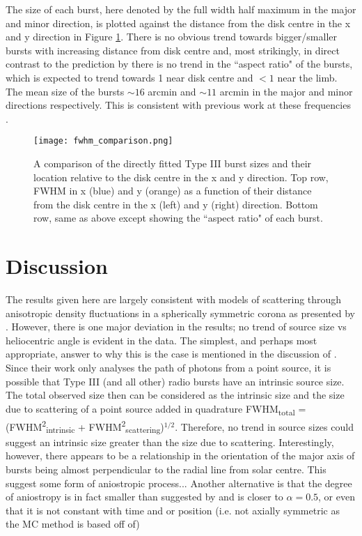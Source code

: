 The size of each burst, here denoted by the full width half maximum in the major and minor direction, is plotted against the distance from the disk centre in the x and y direction in Figure \ref{fig:fwhm_comp}. There is no obvious trend towards bigger/smaller bursts with increasing distance from disk centre and, most strikingly, in direct contrast to the prediction by \cite{Kontar2019} there is no trend in the ``aspect ratio" of the bursts, which is expected to trend towards 1 near disk centre and $< 1$ near the limb. The mean size of the bursts $\sim 16$ arcmin and $\sim 11$ arcmin in the major and minor directions respectively. This is consistent with previous work at these frequencies \citep{Kontar2017, Murphy2021}.

\begin{figure}
\centering
\texttt{[image: fwhm\_comparison.png]}
\caption[Directly fitted Type III burst sizes as a function of position relative to disk centre.]{A comparison of the directly fitted Type III burst sizes and their location relative to the disk centre in the x and y direction. Top row, FWHM in x (blue) and y (orange) as a function of their distance from the disk centre in the x (left) and y (right) direction. Bottom row, same as above except showing the ``aspect ratio" of each burst.}
\label{fig:fwhm_comp}
\end{figure}

\section{Discussion}
\label{sec:obsvtheory_discussion}
The results given here are largely consistent with models of scattering through anisotropic density fluctuations in a spherically symmetric corona as presented by \cite{Kontar2019}. However, there is one major deviation in the results; no trend of source size vs heliocentric angle is evident in the data. The simplest, and perhaps most appropriate, answer to why this is the case is mentioned in the discussion of \cite{Kontar2019}. Since their work only analyses the path of photons from a point source, it is possible that Type III (and all other) radio bursts have an intrinsic source size. The total observed size then can be considered as the intrinsic size and the size due to scattering of a point source added in quadrature FWHM\textsubscript{total} = (FWHM\textsuperscript{2}\textsubscript{intrinsic} + FWHM\textsuperscript{2}\textsubscript{scattering})$^{1/2}$. Therefore, no trend in source sizes could suggest an intrinsic size greater than the size due to scattering. Interestingly, however, there appears to be a relationship in the orientation of the major axis of bursts being almost perpendicular to the radial line from solar centre. This suggest some form of aniostropic process... Another alternative is that the degree of aniostropy is in fact smaller than suggested by \cite{Kontar2019} and is closer to $\alpha = 0.5$, or even that it is not constant with time and or position (i.e. not axially symmetric as the MC method is based off of)
